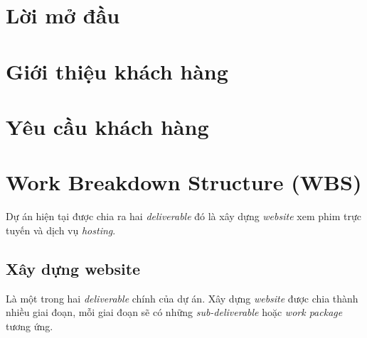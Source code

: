 \documentclass[a4paper]{book}
\begin{document}
\chapter*{Lời mở đầu}
\chapter{Giới thiệu khách hàng}
\chapter{Yêu cầu khách hàng}
\chapter{Work Breakdown Structure (WBS)}
Dự án hiện tại được chia ra hai \textit{deliverable} đó là xây dựng \textit{website} xem phim trực tuyến và dịch vụ \textit{hosting}.
\section{Xây dựng website}
Là một trong hai \textit{deliverable} chính của dự án. Xây dựng \textit{website} được chia thành nhiều giai đoạn, mỗi giai đoạn sẽ có những \textit{sub-deliverable} hoặc \textit{work package} tương ứng.
\end{document}
